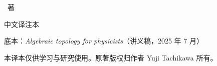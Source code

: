 \begin{titlepage}
\centering
\vspace*{3cm}

{\Huge\bfseries \booktitlezh\par}
\vspace{6mm}
{\large \booktitleen\par}

\vspace{2.4cm}
{\Large \bookauthor\ 著\par}

\vspace{3.2cm}
{\large 中文译注本\par}
\vspace{4mm}
{\normalsize 底本：\textit{Algebraic topology for physicists}（讲义稿，2025 年 7 月）\par}

\vfill
{\small 本译本仅供学习与研究使用。原著版权归作者 Yuji Tachikawa 所有。\par}
\end{titlepage}
